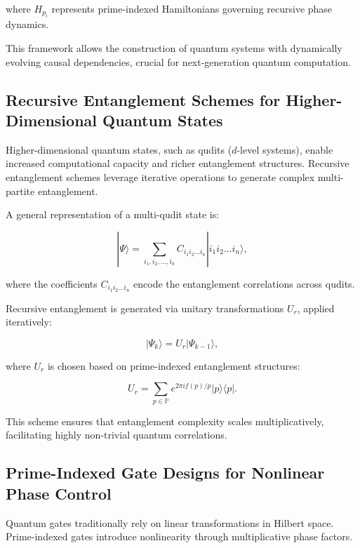 \documentclass{article}
\theoremstyle{plain}
\begin{document}
where \( H_{p_i} \) represents prime-indexed Hamiltonians governing recursive phase dynamics.

This framework allows the construction of quantum systems with dynamically evolving causal dependencies, crucial for next-generation quantum computation.

\subsection{Recursive Entanglement Schemes for Higher-Dimensional Quantum States}

Higher-dimensional quantum states, such as qudits (\( d \)-level systems), enable increased computational capacity and richer entanglement structures. Recursive entanglement schemes leverage iterative operations to generate complex multi-partite entanglement.

A general representation of a multi-qudit state is:

\begin{equation}
|\Psi\rangle = \sum_{i_1, i_2, \dots, i_n} C_{i_1 i_2 \dots i_n} |i_1 i_2 \dots i_n\rangle,
\end{equation}

where the coefficients \( C_{i_1 i_2 \dots i_n} \) encode the entanglement correlations across qudits.

Recursive entanglement is generated via unitary transformations \( U_r \), applied iteratively:

\begin{equation}
|\Psi_k\rangle = U_r |\Psi_{k-1}\rangle,
\end{equation}

where \( U_r \) is chosen based on prime-indexed entanglement structures:

\begin{equation}
U_r = \sum_{p \in \mathbb{P}} e^{2\pi i f(p) / p} |p\rangle \langle p|.
\end{equation}

This scheme ensures that entanglement complexity scales multiplicatively, facilitating highly non-trivial quantum correlations.

\subsection{Prime-Indexed Gate Designs for Nonlinear Phase Control}

Quantum gates traditionally rely on linear transformations in Hilbert space. Prime-indexed gates introduce nonlinearity through multiplicative phase factors.
\end{document}
